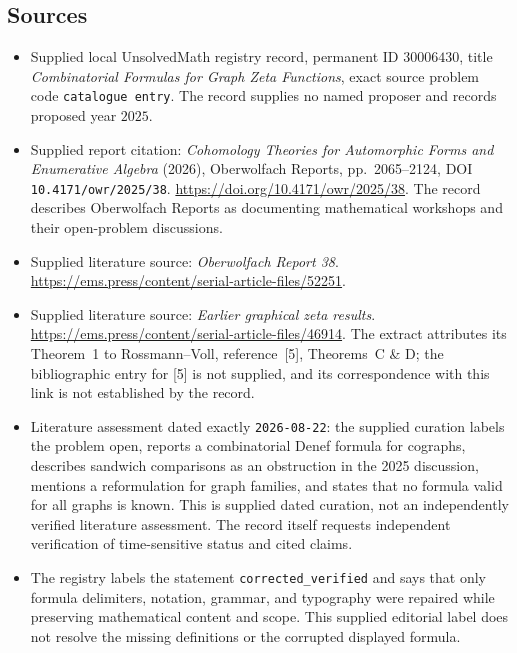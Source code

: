 \documentclass[11pt]{article}
\begin{document}
\subsection{Sources}
\begin{itemize}
\item Supplied local UnsolvedMath registry record, permanent ID \(30006430\), title \emph{Combinatorial Formulas for Graph Zeta Functions}, exact source problem code \texttt{catalogue entry}. The record supplies no named proposer and records proposed year \(2025\).
\item Supplied report citation: \emph{Cohomology Theories for Automorphic Forms and Enumerative Algebra} (2026), Oberwolfach Reports, pp.~2065--2124, DOI \texttt{10.4171/owr/2025/38}. \url{https://doi.org/10.4171/owr/2025/38}. The record describes Oberwolfach Reports as documenting mathematical workshops and their open-problem discussions.
\item Supplied literature source: \emph{Oberwolfach Report 38}. \url{https://ems.press/content/serial-article-files/52251}.
\item Supplied literature source: \emph{Earlier graphical zeta results}. \url{https://ems.press/content/serial-article-files/46914}. The extract attributes its Theorem~1 to Rossmann--Voll, reference~[5], Theorems~C \& D; the bibliographic entry for [5] is not supplied, and its correspondence with this link is not established by the record.
\item Literature assessment dated exactly \texttt{2026-08-22}: the supplied curation labels the problem open, reports a combinatorial Denef formula for cographs, describes sandwich comparisons as an obstruction in the 2025 discussion, mentions a reformulation for graph families, and states that no formula valid for all graphs is known. This is supplied dated curation, not an independently verified literature assessment. The record itself requests independent verification of time-sensitive status and cited claims.
\item The registry labels the statement \texttt{corrected\_verified} and says that only formula delimiters, notation, grammar, and typography were repaired while preserving mathematical content and scope. This supplied editorial label does not resolve the missing definitions or the corrupted displayed formula.
\end{itemize}
\end{document}
